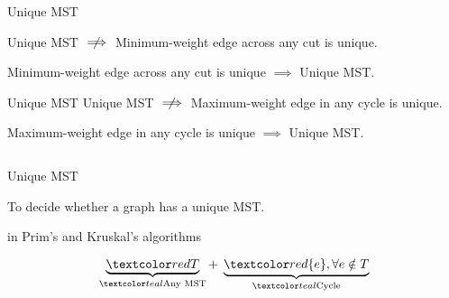 \begin{frame}{}
  \begin{exampleblock}{Unique MST }
    \centerline{Unique MST $\centernot\implies$ Minimum-weight edge across any cut is unique.}
  \end{exampleblock}

  \pause

  \pause
  \begin{theorem}
    \centerline{Minimum-weight edge across any cut is unique $\implies$ Unique MST.}
  \end{theorem}
\end{frame}

\begin{frame}{}
  \begin{exampleblock}{Unique MST }
    Unique MST $\centernot\implies$ Maximum-weight edge in any cycle is unique.
  \end{exampleblock}

  \pause

  \pause
  \begin{theorem}
    \centerline{Maximum-weight edge in any cycle is unique $\implies$ Unique MST.}
  \end{theorem}

\end{frame}

\begin{frame}{}

  \begin{columns}
  \end{columns}
\end{frame}

\begin{frame}{}
  \begin{exampleblock}{Unique MST }
    \centerline{To decide whether a graph has a unique MST.}
  \end{exampleblock}

  \pause
  \vspace{0.80cm}
  \centerline{\large {} in Prim's and Kruskal's algorithms}

  \pause

  \pause
  \[
    \underbrace{\red{T}}_{\teal{\text{Any MST}}} +\; \underbrace{\red{\set{e}}, \forall e \notin T}_{\teal{\text{Cycle}}}
  \]
\end{frame}
